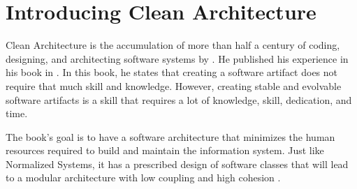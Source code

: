 \section{Introducing Clean Architecture}

Clean Architecture is the accumulation of more than half a century of coding, designing,
and architecting software systems by \citeauthor*[]{martin_clean_2018}. He published his
experience in his book  in \citeyear[]{martin_clean_2018}.
In this book, he states that creating a software artifact does not require that much skill
and knowledge. However, creating stable and evolvable software artifacts is a skill that
requires a lot of knowledge, skill, dedication, and time.

The book's goal is to have a software architecture that minimizes the human resources
required to build and maintain the information system. Just like Normalized Systems, it
has a prescribed design of software classes that will lead to a modular architecture with
low coupling and high cohesion \parencite{martin_clean_2018}.
